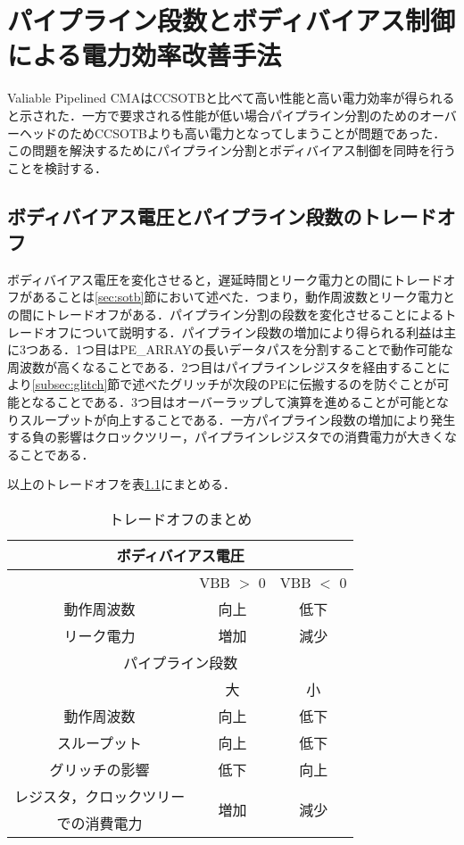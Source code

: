 \chapter{パイプライン段数とボディバイアス制御による電力効率改善手法}
{
\label{chap:proposal}
Valiable Pipelined CMAはCCSOTBと比べて高い性能と高い電力効率が得られると示された．\cite{vpcma}一方で要求される性能が低い場合パイプライン分割のためのオーバーヘッドのためCCSOTBよりも高い電力となってしまうことが問題であった．この問題を解決するためにパイプライン分割とボディバイアス制御を同時を行うことを検討する．
\section{ボディバイアス電圧とパイプライン段数のトレードオフ}
\label{sec:trade_off}

ボディバイアス電圧を変化させると，遅延時間とリーク電力との間にトレードオフがあることは\ref{sec:sotb}節において述べた．つまり，動作周波数とリーク電力との間にトレードオフがある．パイプライン分割の段数を変化させることによるトレードオフについて説明する．パイプライン段数の増加により得られる利益は主に3つある．1つ目はPE\_ARRAYの長いデータパスを分割することで動作可能な周波数が高くなることである．2つ目はパイプラインレジスタを経由することにより\ref{subsec:glitch}節で述べたグリッチが次段のPEに伝搬するのを防ぐことが可能となることである．3つ目はオーバーラップして演算を進めることが可能となりスループットが向上することである．一方パイプライン段数の増加により発生する負の影響はクロックツリー，パイプラインレジスタでの消費電力が大きくなることである．

以上のトレードオフを表\ref{table:trade_off}にまとめる．

\begin{table}[h]
\centering
\caption{トレードオフのまとめ}
\label{table:trade_off}
\begin{tabular}{|c|c|c|} \hline
\multicolumn{3}{|c|}{ボディバイアス電圧} \\ \hline
 & VBB $>$ 0 & VBB $<$ 0 \\ \hline \hline
動作周波数 & 向上 & 低下 \\ \hline
リーク電力 & 増加 & 減少 \\ \hline \hline
\multicolumn{3}{|c|}{パイプライン段数} \\ \hline
& 大 & 小 \\ \hline \hline
動作周波数 & 向上 & 低下 \\ \hline
スループット & 向上 & 低下 \\ \hline
グリッチの影響 & 低下 & 向上 \\ \hline
レジスタ，クロックツリー & \multirow{2}{*}{増加} & \multirow{2}{*}{減少}\\ 
での消費電力　& & \\ \hline
\end{tabular}
\end{table}

}
